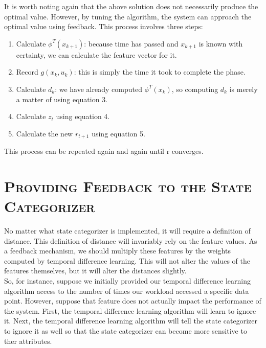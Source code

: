 \documentclass[11pt]{article}
\numberwithin{figure}{section}
\begin{document}
			It is worth noting again that the above solution does not necessarily produce the optimal value. However, by tuning the algorithm, the system can approach the optimal value using feedback. This process involves three steps:
			\begin{enumerate}
				\item Calculate \begin{math}\phi^T(x_{k+1})\end{math}: because time has passed and  \begin{math}x_{k+1}\end{math} is known with certainty, we can calculate the feature vector for it.
				\item Record \begin{math}g(x_k, u_k)\end{math}: this is simply the time it took to complete the phase.
				\item Calculate \begin{math}d_k\end{math}: we have already computed \begin{math}\phi^T(x_{k})\end{math}, so computing \begin{math}d_k\end{math} is merely a matter of using equation 3.
				\item Calculate \begin{math}z_t\end{math} using equation 4. 
				\item Calculate the new \begin{math}r_{t+1}\end{math} using equation 5.
			\end{enumerate}
			This process can be repeated again and again until r converges.
	\section{\textsc{Providing Feedback to the State Categorizer}}
		No matter what state categorizer is implemented, it will require a definition of distance. This definition of distance will invariably rely on the feature values. As a feedback mechanism, we should multiply these features by the weights computed by temporal difference learning. This will not alter the values of the features themselves, but it will alter the distances slightly.\\
		
		So, for instance, suppose we initially provided our temporal difference learning algorithm access to the number of times our workload accessed a specific data point. However, suppose that feature does not actually impact the performance of the system. First, the temporal difference learning algorithm will learn to ignore it. Next, the temporal difference learning algorithm will tell the state categorizer to ignore it as well so that the state categorizer can become more sensitive to ther attributes.
\end{document}
